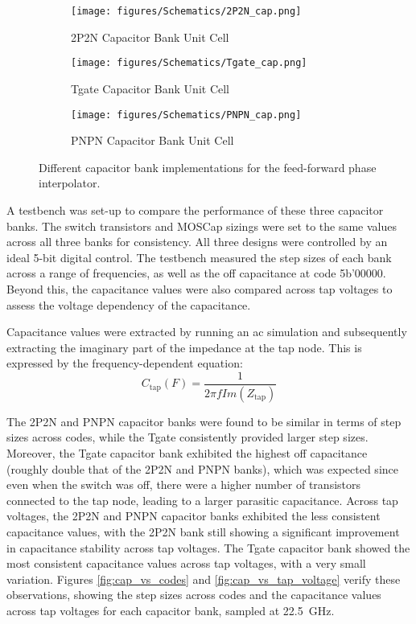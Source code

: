 \begin{figure}[h]
  \hfill
  \begin{subfigure}[b]{0.15\linewidth}
    \centering
    \texttt{[image: figures/Schematics/2P2N\_cap.png]}
    \caption{2P2N Capacitor Bank Unit Cell}
    \label{fig:2P2N_cap}
  \end{subfigure}
  \hfill
  \begin{subfigure}[b]{0.2\linewidth}
    \centering
    \texttt{[image: figures/Schematics/Tgate\_cap.png]}
    \caption{Tgate Capacitor Bank Unit Cell}
    \label{fig:Tgate_cap}
  \end{subfigure}
  \hfill
  \begin{subfigure}[b]{0.15\linewidth}
    \centering
    \texttt{[image: figures/Schematics/PNPN\_cap.png]}
    \caption{PNPN Capacitor Bank Unit Cell}
    \label{fig:PNPN_cap}
  \end{subfigure}
  \hfill\null
  \caption{Different capacitor bank implementations for the feed-forward phase interpolator.}
\end{figure}

A testbench was set-up to compare the performance of these three capacitor banks. The switch transistors and MOSCap sizings were set to the same values across all three banks for consistency. All three designs were controlled by an ideal 5-bit digital control. The testbench measured the step sizes of each bank across a range of frequencies, as well as the off capacitance at code 5b'00000. Beyond this, the capacitance values were also compared across tap voltages to assess the voltage dependency of the capacitance.

Capacitance values were extracted by running an ac simulation and subsequently extracting the imaginary part of the impedance at the tap node. This is expressed by the frequency-dependent equation:
\begin{equation}
  C_{\text{tap}}(F) = \frac{1}{2\pi f \textit{Im}(Z_{\text{tap}})}
\end{equation}

The 2P2N and PNPN capacitor banks were found to be similar in terms of step sizes across codes, while the Tgate consistently provided larger step sizes. Moreover, the Tgate capacitor bank exhibited the highest off capacitance (roughly double that of the 2P2N and PNPN banks), which was expected since even when the switch was off, there were a higher number of transistors connected to the tap node, leading to a larger parasitic capacitance.
Across tap voltages, the 2P2N and PNPN capacitor banks exhibited the less consistent capacitance values, with the 2P2N bank still showing a significant improvement in capacitance stability across tap voltages. The Tgate capacitor bank showed the most consistent capacitance values across tap voltages, with a very small variation.
Figures \ref{fig:cap_vs_codes} and \ref{fig:cap_vs_tap_voltage} verify these observations, showing the step sizes across codes and the capacitance values across tap voltages for each capacitor bank, sampled at 22.5~GHz.

